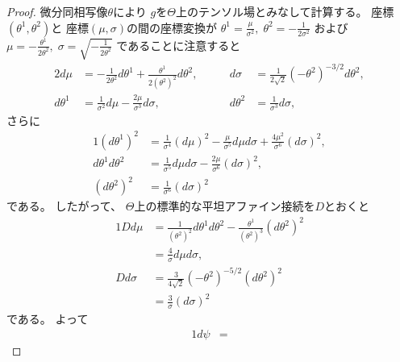\documentclass[report]{jlreq}
\begin{document}
\begin{proof}
    微分同相写像$\theta$により
    $g$を$\Theta$上のテンソル場とみなして計算する。
    座標$(\theta^1, \theta^2)$と
    座標$(\mu, \sigma)$の間の座標変換が
    $\theta^1 = \frac{\mu}{\sigma^2}, \;
        \theta^2 = -\frac{1}{2 \sigma^2}$
    および
    $\mu = -\frac{\theta^1}{2\theta^2}, \;
        \sigma = \sqrt{-\frac{1}{2\theta^2}}$
    であることに注意すると
    \begin{alignat}{2}
        d\mu
            &=
                - \frac{1}{2\theta^2} d\theta^1
                + \frac{\theta^1}{2(\theta^2)^2} d\theta^2,
            &\qquad
        d\sigma
            &=
                \frac{1}{2\sqrt{2}} (-\theta^2)^{-3/2} d\theta^2,
                \\
        d\theta^1
            &=
                \frac{1}{\sigma^2} d\mu
                - \frac{2\mu}{\sigma^3} d\sigma,
            &\qquad
        d\theta^2
            &=
                \frac{1}{\sigma^3} d\sigma,
    \end{alignat}
    さらに
    \begin{alignat}{1}
        (d\theta^1)^2
            &=
                \frac{1}{\sigma^4} (d\mu)^2
                - \frac{\mu}{\sigma^5} d\mu d\sigma
                + \frac{4\mu^2}{\sigma^6} (d\sigma)^2,
                \\
        d\theta^1 d\theta^2
            &=
                \frac{1}{\sigma^5} d\mu d\sigma
                - \frac{2\mu}{\sigma^6} (d\sigma)^2,
                \\
        (d\theta^2)^2
            &=
                \frac{1}{\sigma^6} (d\sigma)^2
    \end{alignat}
    である。
    したがって、
    $\Theta$上の標準的な平坦アファイン接続を$D$とおくと
    \begin{alignat}{1}
        Dd\mu
            &=
                \frac{1}{(\theta^2)^2} d\theta^1 d\theta^2
                - \frac{\theta^1}{(\theta^2)^3} (d\theta^2)^2
                \\
            &=
                \frac{4}{\sigma} d\mu d\sigma,
                \\
        Dd\sigma
            &=
                \frac{3}{4\sqrt{2}} (-\theta^2)^{-5/2} (d\theta^2)^2
                \\
            &=
                \frac{3}{\sigma} (d\sigma)^2
    \end{alignat}
    である。
    よって
    \begin{alignat}{1}
        d\psi
            &=

\end{alignat}
\end{proof}
\end{document}
